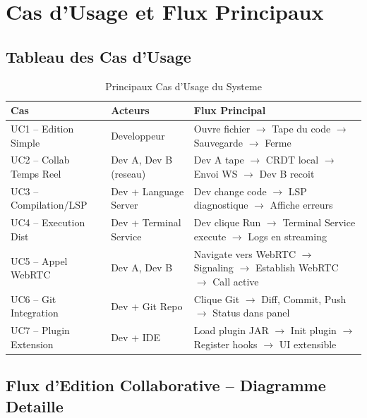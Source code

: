 \documentclass[11pt,a4paper,hidelinks]{book}
\begin{document}
\section{Cas d'Usage et Flux Principaux}

\subsection{Tableau des Cas d'Usage}

\begin{table}[H]
\centering
\caption{Principaux Cas d'Usage du Systeme}
\begin{tabularx}{\textwidth}{l X X}
\toprule
\textbf{Cas} & \textbf{Acteurs} & \textbf{Flux Principal} \\
\midrule
UC1 -- Edition Simple & Developpeur & Ouvre fichier $\to$ Tape du code $\to$ Sauvegarde $\to$ Ferme \\
\midrule
UC2 -- Collab Temps Reel & Dev A, Dev B (reseau) & Dev A tape $\to$ CRDT local $\to$ Envoi WS $\to$ Dev B recoit \\
\midrule
UC3 -- Compilation/LSP & Dev + Language Server & Dev change code $\to$ LSP diagnostique $\to$ Affiche erreurs \\
\midrule
UC4 -- Execution Dist & Dev + Terminal Service & Dev clique Run $\to$ Terminal Service execute $\to$ Logs en streaming \\
\midrule
UC5 -- Appel WebRTC & Dev A, Dev B & Navigate vers WebRTC $\to$ Signaling $\to$ Establish WebRTC $\to$ Call active \\
\midrule
UC6 -- Git Integration & Dev + Git Repo & Clique Git $\to$ Diff, Commit, Push $\to$ Status dans panel \\
\midrule
UC7 -- Plugin Extension & Dev + IDE & Load plugin JAR $\to$ Init plugin $\to$ Register hooks $\to$ UI extensible \\
\bottomrule
\end{tabularx}
\end{table}

\subsection{Flux d'Edition Collaborative -- Diagramme Detaille}
\end{document}
